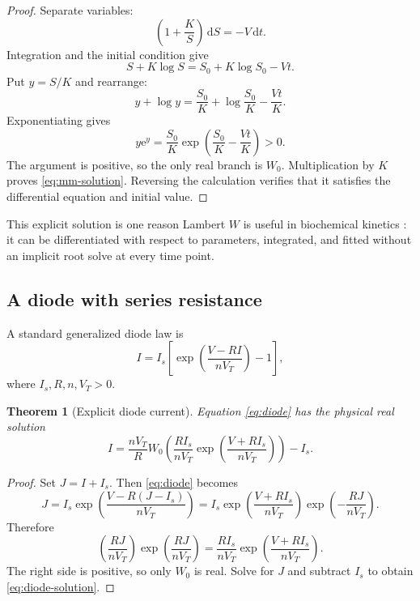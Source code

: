 \documentclass[11pt]{article}
\numberwithin{equation}{section}
\newtheorem{theorem}{Theorem}[section]
\theoremstyle{definition}
\theoremstyle{remark}
\newcommand{\e}{\mathrm e}
\newcommand{\dd}{\,\mathrm d}
\begin{document}
\begin{proof}
Separate variables:
\[
 \left(1+\frac KS\right)\dd S=-V\dd t.
\]
Integration and the initial condition give
\[
 S+K\log S=S_0+K\log S_0-Vt.
\]
Put $y=S/K$ and rearrange:
\[
 y+\log y=\frac{S_0}{K}+\log\frac{S_0}{K}-\frac{Vt}{K}.
\]
Exponentiating gives
\[
 y\e^y=\frac{S_0}{K}
       \exp\!\left(\frac{S_0}{K}-\frac{Vt}{K}\right)>0.
\]
The argument is positive, so the only real branch is $W_0$.  Multiplication by
$K$ proves \eqref{eq:mm-solution}.  Reversing the calculation verifies that it
satisfies the differential equation and initial value.
\end{proof}

This explicit solution is one reason Lambert $W$ is useful in biochemical
kinetics \cite{Golicnik2012}: it can be differentiated with respect to
parameters, integrated, and fitted without an implicit root solve at every
time point.

\subsection{A diode with series resistance}

A standard generalized diode law is
\begin{equation}
 I=I_s\left[
  \exp\!\left(\frac{V-RI}{nV_T}\right)-1
 \right],                                              \label{eq:diode}
\end{equation}
where $I_s,R,n,V_T>0$.

\begin{theorem}[Explicit diode current]
\label{thm:diode}
Equation \eqref{eq:diode} has the physical real solution
\begin{equation}
 I=\frac{nV_T}{R}W_0\!\left(
   \frac{RI_s}{nV_T}
   \exp\!\left(\frac{V+RI_s}{nV_T}\right)
 \right)-I_s.                                          \label{eq:diode-solution}
\end{equation}
\end{theorem}

\begin{proof}
Set $J=I+I_s$.  Then \eqref{eq:diode} becomes
\[
 J=I_s\exp\!\left(\frac{V-R(J-I_s)}{nV_T}\right)
  =I_s\exp\!\left(\frac{V+RI_s}{nV_T}\right)
       \exp\!\left(-\frac{RJ}{nV_T}\right).
\]
Therefore
\[
 \left(\frac{RJ}{nV_T}\right)
 \exp\!\left(\frac{RJ}{nV_T}\right)
 =\frac{RI_s}{nV_T}
  \exp\!\left(\frac{V+RI_s}{nV_T}\right).
\]
The right side is positive, so only $W_0$ is real.  Solve for $J$ and subtract
$I_s$ to obtain \eqref{eq:diode-solution}.
\end{proof}
\end{document}
